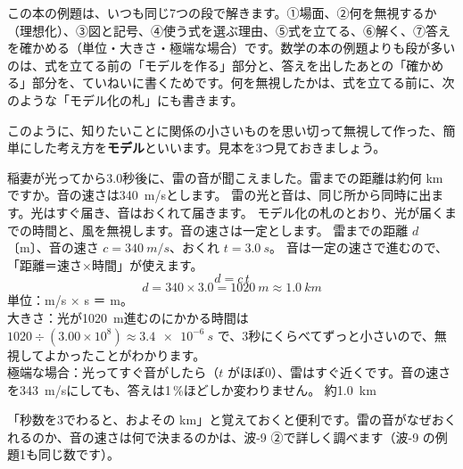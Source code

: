 \leavevmode\label{ph:波-0:sec4}この本の例題は、いつも同じ7つの段で解きます。①場面、②何を無視するか（理想化）、③図と記号、④使う式を選ぶ理由、⑤式を立てる、⑥解く、⑦答えを確かめる（単位・大きさ・極端な場合）です。数学の本の例題よりも段が多いのは、式を立てる前の「モデルを作る」部分と、答えを出したあとの「確かめる」部分を、ていねいに書くためです。何を無視したかは、式を立てる前に、次のような「モデル化の札」にも書きます。
\begin{phmodel}[雷の光と音]
\end{phmodel}
このように、知りたいことに関係の小さいものを思い切って無視して作った、簡単にした考え方を\textbf{モデル}といいます。見本を3つ見ておきましょう。

\begin{phreidai}[雷までの距離]\label{ph:波-0:ex1}
稲妻が光ってから3.0秒後に、雷の音が聞こえました。雷までの距離は約何 km ですか。音の速さは\qty{340}{m/s}とします。
\phbamen
雷の光と音は、同じ所から同時に出ます。光はすぐ届き、音はおくれて届きます。
\phmushi
モデル化の札のとおり、光が届くまでの時間と、風を無視します。音の速さは一定とします。
\phzu
雷までの距離 $d$〔m〕、音の速さ $c=\qty{340}{m/s}$、おくれ $t=\qty{3.0}{s}$。
\phriyu
音は一定の速さで進むので、「距離＝速さ×時間」が使えます。
\phtateru
\[d=c\,t\]
\phtoku
\[d=340\times3.0=\qty{1020}{m}\approx\qty{1.0}{km}\]
\phtashikame
単位：m/s × s ＝ m。\\
大きさ：光が\qty{1020}{m}進むのにかかる時間は $1020\div(3.00\times10^8)\approx\qty{3.4e-6}{s}$ で、3秒にくらべてずっと小さいので、無視してよかったことがわかります。\\
極端な場合：光ってすぐ音がしたら（$t$ がほぼ0）、雷はすぐ近くです。音の速さを\qty{343}{m/s}にしても、答えは1\,\%ほどしか変わりません。
\kotae 約\qty{1.0}{km}
\end{phreidai}
\noindent 「秒数を3でわると、およその km」と覚えておくと便利です。雷の音がなぜおくれるのか、音の速さは何で決まるのかは、波-9 ②で詳しく調べます（波-9 の例題1も同じ数です）。

